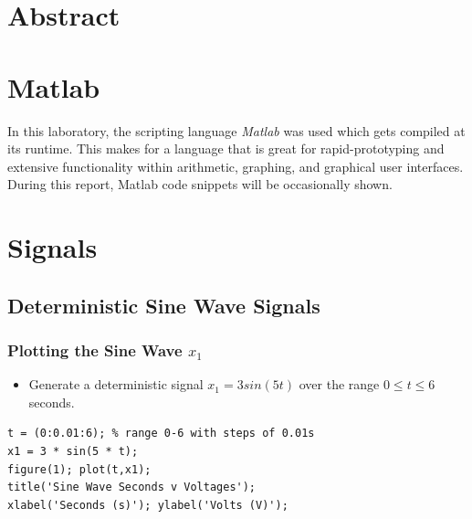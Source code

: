 \documentclass[12pt]{article}
\begin{document}

\section{Abstract}

\section{Matlab}
In this laboratory, the scripting language \emph{Matlab} was used which gets compiled at its runtime. This makes for a language that is great for rapid-prototyping and extensive functionality within arithmetic, graphing, and graphical user interfaces. During this report, Matlab code snippets will be occasionally shown.

\section{Signals}
\subsection{Deterministic Sine Wave Signals}
\subsubsection{Plotting the Sine Wave $x_1$}
\begin{itemize}
\item Generate a deterministic signal $x_1=3sin(5t)$ over the range $0 \leq t \leq 6$ seconds.
\end{itemize}

\begin{lstlisting}
t = (0:0.01:6); % range 0-6 with steps of 0.01s
x1 = 3 * sin(5 * t);
figure(1); plot(t,x1);
title('Sine Wave Seconds v Voltages');
xlabel('Seconds (s)'); ylabel('Volts (V)');
\end{lstlisting}
\end{document}
